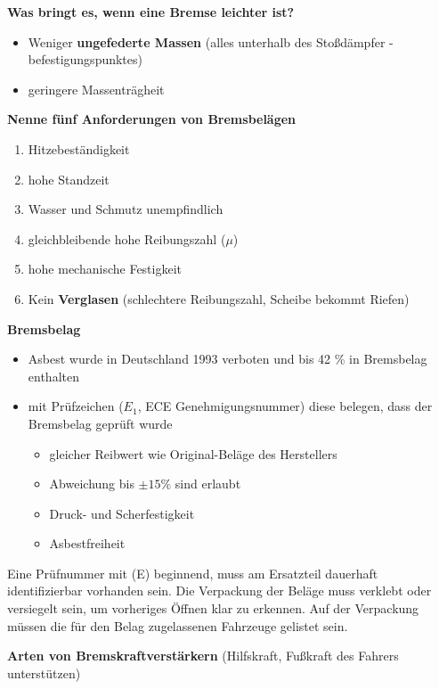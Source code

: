\textbf{Was bringt es, wenn eine Bremse leichter ist?}

\begin{itemize}
\item
  Weniger \textbf{ungefederte Massen} (alles unterhalb des Stoßdämpfer
  -befestigungspunktes)
\item
  geringere Massenträgheit
\end{itemize}

\textbf{Nenne fünf Anforderungen von Bremsbelägen}

\begin{enumerate}
\item
  Hitzebeständigkeit
\item
  hohe Standzeit
\item
  Wasser und Schmutz unempfindlich
\item
  gleichbleibende hohe Reibungszahl ($\mu$)
\item
  hohe mechanische Festigkeit
\item
  Kein \textbf{Verglasen} (schlechtere Reibungszahl, Scheibe bekommt
  Riefen)
\end{enumerate}

\textbf{Bremsbelag}

\begin{itemize}
\item
  Asbest wurde in Deutschland 1993 verboten und bis 42 \% in Bremsbelag
  enthalten
\item
  mit Prüfzeichen ($E_1$, ECE Genehmigungsnummer) diese belegen, dass
  der Bremsbelag geprüft wurde

  \begin{itemize}
  \item
    gleicher Reibwert wie Original-Beläge des Herstellers
  \item
    Abweichung bis $\pm15 \%$ sind erlaubt
  \item
    Druck- und Scherfestigkeit
  \item
    Asbestfreiheit
  \end{itemize}
\end{itemize}

Eine Prüfnummer mit (E) beginnend, muss am Ersatzteil dauerhaft
identifizierbar vorhanden sein. Die Verpackung der Beläge muss verklebt
oder versiegelt sein, um vorheriges Öffnen klar zu erkennen. Auf der
Verpackung müssen die für den Belag zugelassenen Fahrzeuge gelistet
sein.

\textbf{Arten von Bremskraftverstärkern} (Hilfskraft, Fußkraft des
Fahrers unterstützen)

